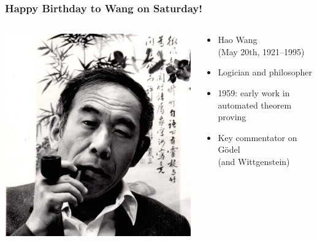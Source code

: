 \begin{frame}
  \frametitle{Happy Birthday to Wang on Saturday!}

  \begin{columns}
    \begin{column}{.5\textwidth}
      \includegraphics[height=.8\textheight]{../assets/wang}
    \end{column}
    \begin{column}{.6\textwidth}
      \begin{itemize}[<+->]
        \item Hao Wang \\ (May 20th, 1921--1995)
\item Logician and philosopher 

\item 1959: early work in automated theorem proving


\item Key commentator on G\"odel \\ (and Wittgenstein)


\end{itemize}
\end{column}
\end{columns}
\end{frame}
